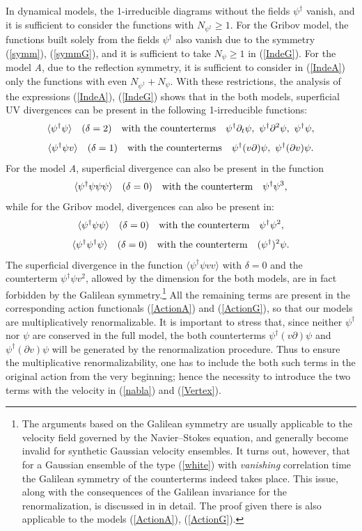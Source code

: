 \documentclass[12pt]{article}
\begin{document}
In dynamical models, the 1-irreducible diagrams without the fields
$\psi^{\dag}$ vanish, and it is sufficient to consider the functions
with $N_{\psi^{\dag}} \ge 1$. For the Gribov model, the functions built
solely from the fields $\psi^{\dag}$ also vanish due to the symmetry
(\ref{symm}), (\ref{symmG}), and it is sufficient to take $N_{\psi}\ge1$
in (\ref{IndeG}). For the model {\it A}, due to the reflection symmetry,
it is sufficient to consider in (\ref{IndeA}) only the functions with
even $N_{\psi^{\dag}}+N_{\psi}$. With these restrictions, the analysis of
the expressions (\ref{IndeA}), (\ref{IndeG}) shows that in the both
models, superficial UV divergences can be present in the following
1-irreducible functions:
\[ \langle \psi^{\dag} \psi \rangle \quad (\delta=2) \quad
{\rm with\ the\ counterterms} \quad \psi^{\dag}\partial_{t}\psi, \
\psi^{\dag}\partial^{2}\psi, \ \psi^{\dag}\psi, \]
\[ \langle \psi^{\dag} \psi v \rangle \quad (\delta=1) \quad
{\rm with\ the\ counterterms} \quad \psi^{\dag} (v\partial) \psi, \
\psi^{\dag} (\partial v) \psi.  \]
For the model {\it A}, superficial divergence can also be present in
the function
\[ \langle \psi^{\dag} \psi\psi\psi \rangle \quad (\delta=0) \quad
{\rm with\ the\ counterterm} \quad \psi^{\dag} \psi^{3}, \]
while for the Gribov model, divergences can also be present in:
\[ \langle \psi^{\dag} \psi\psi \rangle \quad (\delta=0) \quad
{\rm with\ the\ counterterm} \quad \psi^{\dag} \psi^{2}, \]
\[ \langle \psi^{\dag} \psi^{\dag}\psi \rangle \quad (\delta=0) \quad
{\rm with\ the\ counterterm} \quad (\psi^{\dag})^{2} \psi. \]
The superficial divergence in the function
$\langle \psi^{\dag} \psi vv \rangle$ with $\delta=0$ and the
counterterm $\psi^{\dag} \psi v^{2}$, allowed by the dimension
for the both models, are in fact forbidden by the Galilean
symmetry.\footnote{The arguments based on the Galilean symmetry are
usually applicable to the velocity field governed by the Navier--Stokes
equation, and generally become invalid for synthetic Gaussian velocity
ensembles. It turns out, however, that for a Gaussian ensemble of the type
(\ref{white}) with {\it vanishing} correlation time the Galilean symmetry
of the counterterms indeed takes place. This issue, along with the
consequences of the Galilean invariance for the renormalization, is
discussed in \cite{Alexa} in detail. The proof given there is also
applicable to the models (\ref{ActionA}), (\ref{ActionG}).}
All the remaining terms are present in the corresponding action functionals
(\ref{ActionA}) and (\ref{ActionG}), so that our models are multiplicatively
renormalizable. It is important to stress that, since neither $\psi^{\dag}$
nor $\psi$ are conserved in the full model, the both counterterms
$\psi^{\dag} (v\partial) \psi$  and $\psi^{\dag} (\partial v) \psi$
will be generated by the renormalization procedure. Thus to ensure the
multiplicative renormalizability, one has to include the both such
terms in the original action from the very beginning; hence the
necessity to introduce the two terms with the velocity in (\ref{nabla})
and (\ref{Vertex}).
\end{document}

